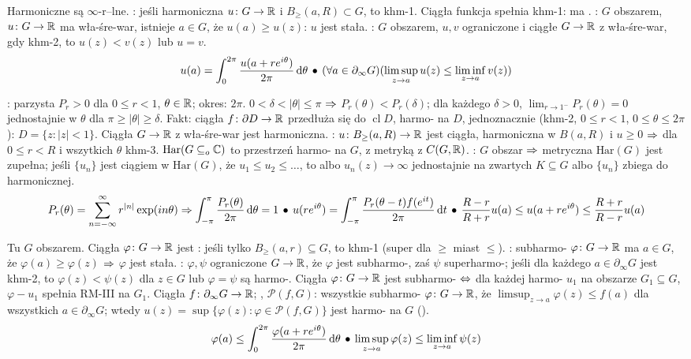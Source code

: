 Harmoniczne  są $\infty$-r--lne.
: jeśli harmoniczna $u \colon G \to \mathbb{R}$ i $B_\ge(a, R) \subset G$, to khm-1.
Ciągła funkcja spełnia khm-1: ma .
: $G$ obszarem, $u \colon G \to \mathbb{R}$ ma wła-śre-war, istnieje $a \in G$, że $u(a) \ge u(z)$: $u$ jest stała.
: $G$ obszarem, $u, v$ ograniczone i ciągłe $G \to \mathbb{R}$ z wła-śre-war, gdy khm-2, to $u(z) < v(z)$ lub $u = v$.
\[
	u(a) = \int_{0}^{2\pi} \frac{u(a+re^{i\theta})}{2\pi} \,\textrm{d} \theta \, \bullet \,
	(\forall a \in \partial_\infty G)(\limsup_{z \to a} u(z) \le \liminf_{z \to a} v(z))
\]

:  parzysta $P_r > 0$ dla $0 \le r < 1$, $\theta \in \mathbb{R}$; okres: $2\pi$.
$0 < \delta < |\theta| \le \pi$ $\Rightarrow$ $P_r(\theta) < P_r(\delta)$; dla każdego $\delta >0$, $\lim_{r \to 1^-} P_r(\theta) = 0$ jednostajnie w $\theta$ dla $\pi \ge |\theta| \ge \delta$.
Fakt: ciągła $f \colon \partial D \to \mathbb{R}$ przedłuża się do $\operatorname{cl} D$, harmo- na $D$, jednoznacznie (khm-2, $0 \le r < 1$, $0 \le \theta \le 2\pi$): $D = \{z : |z| < 1\}$.
Ciągła $G \to \mathbb{R}$ z wła-śre-war jest harmoniczna.
: $u \colon B_\ge (a, R) \to \mathbb{R}$ jest ciągła, harmoniczna w $B(a, R)$ i $u \ge 0$ $\Rightarrow$ dla $0 \le r < R$ i wszytkich $\theta$ khm-3.
$\textrm{Har}(G \subseteq_o \mathbb{C})$ to przestrzeń harmo- na $G$, z metryką z $C(G, \mathbb{R})$.
: $G$ obszar $\Rightarrow$ metryczna $\textrm{Har}(G)$ jest zupełna; jeśli $\{u_n\}$ jest ciągiem w $\textrm{Har}(G)$, że $u_1 \le u_2 \le \dots$, to albo $u_n(z) \to \infty$ jednostajnie na zwartych $K \subseteq G$ albo $\{u_n\}$ zbiega do harmonicznej.
\[
	P_r (\theta) = \sum_{n = -\infty}^\infty r^{|n|} \exp(in \theta) \Rightarrow \int_{-\pi}^\pi \frac{P_r(\theta)}{2\pi} \,\textrm{d} \theta = 1 \, \bullet \,
	u(re^{i\theta}) = \int_{-\pi}^\pi \frac{P_r(\theta - t) f(e^{it})}{2\pi} \,\textrm{d} t \, \bullet \,
	\frac{R-r}{R+r} u(a) \le u(a + re^{i \theta}) \le \frac{R+r}{R-r} u(a)
\]


Tu  $G$ obszarem.
Ciągła $\varphi \colon G \to \mathbb{R}$ jest : jeśli tylko $B_\ge (a,r) \subseteq G$, to khm-1 (super dla $\ge$ miast $\le$).
: subharmo- $\varphi \colon G \to \mathbb{R}$ ma $a \in G$, że $\varphi(a) \ge \varphi(z)$ $\Rightarrow$ $\varphi$ jest stała.
: $\varphi, \psi$ ograniczone $G \to \mathbb{R}$, że $\varphi$ jest subharmo-, zaś $\psi$ superharmo-; jeśli dla każdego $a \in \partial_\infty G$ jest khm-2, to $\varphi(z) < \psi(z)$ dla $z \in G$ lub $\varphi = \psi$ są harmo-.
Ciągła $\varphi \colon G \to \mathbb{R}$ jest subharmo- $\Leftrightarrow$ dla każdej harmo- $u_1$ na obszarze $G_1 \subseteq G$, $\varphi - u_1$ spełnia RM-III na $G_1$.
Ciągła $f \colon \partial_\infty G \to \mathbb{R}$; , $\mathscr P(f, G)$: wszystkie subharmo- $\varphi \colon G \to \mathbb{R}$, że $\limsup_{z \to a} \varphi(z) \le f(a)$ dla wszystkich $a \in \partial_\infty G$; wtedy $u(z) = \sup\{\varphi(z) : \varphi \in \mathscr P(f, G)\}$ jest harmo- na $G$ ().
\[
	\varphi(a) \le \int_0^{2\pi} \frac{\varphi(a+re^{i \theta})}{2\pi} \,\textrm{d} \theta \, \bullet \,
	\limsup_{z \to a} \varphi(z) \le \liminf_{z \to a} \psi(z)
\]


